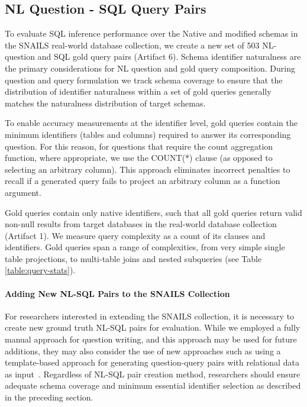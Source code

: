 \subsection{NL Question - SQL Query Pairs}

To evaluate SQL inference performance over the Native and modified schemas in the SNAILS real-world database collection, we create a new set of 503 NL-question and SQL gold query pairs (Artifact 6).
Schema identifier naturalness are the primary considerations for NL question and gold query composition.
During question and query formulation we track schema coverage to ensure that the distribution of identifier naturalness within a set of gold queries generally matches the naturalness distribution of target schemas.

To enable accuracy measurements at the identifier level, gold queries contain the minimum identifiers (tables and columns) required to answer its corresponding question.
For this reason, for questions that require the count aggregation function, where appropriate, we use the COUNT(*) clause (as opposed to selecting an arbitrary column).
This approach eliminates incorrect penalties to recall if a generated query fails to project an arbitrary column as a function argument.

Gold queries contain only native identifiers, such that all gold queries return valid non-null results from target databases in the real-world database collection (Artifact 1).
We measure query complexity as a count of its clauses and identifiers.
Gold queries span a range of complexities, from very simple single table projections, to multi-table joins and nested subqueries (see Table \ref{table:query-stats}).

\paragraph{\textbf{Adding New NL-SQL Pairs to the SNAILS Collection}}
For researchers interested in extending the SNAILS collection, it is necessary to create new ground truth NL-SQL pairs for evaluation. 
While we employed a fully manual approach for question writing, and this approach may be used for future additions, they may also consider the use of new approaches such as using a template-based approach for generating question-query pairs with relational data as input~\cite{10.5555/3666122.3667470}.
Regardless of NL-SQL pair creation method, researchers should ensure adequate schema coverage and minimum essential identifier selection as described in the preceding section.


